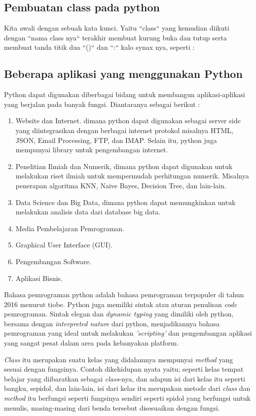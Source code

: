 \subsection{Pembuatan class pada python}
Kita awali dengan sebuah kata kunci. Yaitu ``class`` yang kemudian diikuti dengan ``nama class nya`` terakhir membuat kurung buka dan tutup serta membuat tanda titik dua  ``()`` dan ``:`` kalo synax nya, seperti :

\subsection{Beberapa aplikasi yang menggunakan Python}
Python dapat digunakan diberbagai bidang untuk membangun aplikasi-aplikasi yang berjalan pada banyak fungsi. Diantaranya sebagai berikut :
\begin{enumerate}
\item Website dan Internet. dimana python dapat digunakan sebagai server side yang diintegrasikan dengan berbagai internet protokol misalnya HTML, JSON, Email Processing, FTP, dan IMAP. Selain itu, python juga mempunyai library untuk pengembangan internet.
\item Penelitian Ilmiah dan Numerik, dimana python dapat digunakan untuk melakukan riset ilmiah untuk mempermudah perhitungan numerik. Misalnya penerapan algoritma KNN, Naive Bayes, Decision Tree, dan lain-lain.
\item Data Science dan Big Data, dimana python dapat memungkinkan untuk melakukan analisis data dari database big data.
\item Media Pembelajaran Pemrograman.
\item Graphical User Interface (GUI).
\item Pengembangan Software.
\item Aplikasi Bisnis.
\end{enumerate}

\par
Bahasa pemrograman python adalah bahasa pemrograman terpopuler di tahun 2016 menurut tiobe\cite{https://www.tiobe.com/tiobe-index/}. Python juga memiliki sintak atau aturan penulisan \textit{code} pemrograman. Sintak elegan dan \textit{dynamic typing} yang dimiliki oleh python, bersama dengan \textit{interpreted nature} dari python, menjadikannya bahasa pemrograman yang ideal untuk melakukan \textit{'scripting'} dan pengembangan aplikasi yang sangat pesat dalam area pada kebanyakan platform.

\textit{Class} itu merupakan suatu kelas yang didalamnya mempunyai \textit{method} yang sesuai dengan fungsinya. Contoh dikehidupan nyata yaitu; seperti kelas tempat belajar yang diibaratkan sebagai \textit{class}-nya, dan adapun isi dari kelas itu seperti bangku, sepidol, dan lain-lain, isi dari kelas itu merupakan metode dari \textit{class} dan \textit{method} itu berfungsi seperti fungsinya sendiri seperti spidol yang berfungsi untuk menulis, masing-masing dari benda tersebut disesuaikan dengan fungsi.

